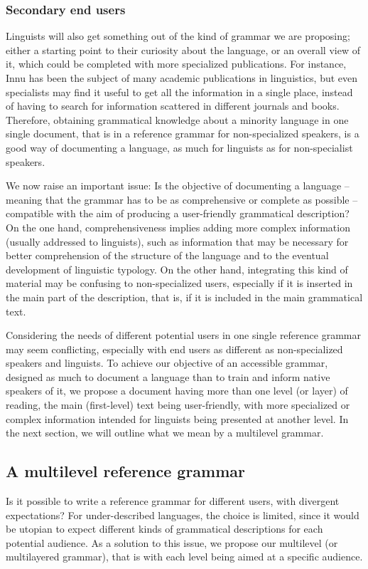 \subsubsection{Secondary end users}
Linguists will also get something out of the kind of grammar we are proposing; either a starting point to their curiosity about the language, or an overall view of it, which could be completed with more specialized publications. For instance, Innu has been the subject of many academic publications in linguistics, but even specialists may find it useful to get all the information in a single place, instead of having to search for information scattered in different journals and books. Therefore, obtaining grammatical knowledge about a minority language in one single document, that is in a reference grammar for non-specialized speakers, is a good way of documenting a language, as much for linguists as for non-specialist speakers.

We now raise an important issue: Is the objective of documenting a language -- meaning that the grammar has to be as comprehensive or complete as possible -- compatible with the aim of producing a user-friendly grammatical description? On the one hand, comprehensiveness implies adding more complex information (usually addressed to linguists), such as information that may be necessary for better comprehension of the structure of the language and to the eventual development of linguistic typology. On the other hand, integrating this kind of material may be confusing to non-specialized users, especially if it is inserted in the main part of the description, that is, if it is included in the main grammatical text.

Considering the needs of different potential users in one single reference grammar may seem conflicting, especially with end users as different as non-specialized speakers and linguists. To achieve our objective of an accessible grammar, designed as much to document a language than to train and inform native speakers of it, we propose a document having more than one level (or layer) of reading, the main (first-level) text being user-friendly, with more specialized or complex information intended for linguists being presented at another level. In the next section, we will outline what we mean by a multilevel grammar. 

\subsection{A multilevel reference grammar}
 Is it possible to write a reference grammar for different users, with divergent expectations? For under-described languages, the choice is limited, since it would be utopian to expect different kinds of grammatical descriptions for each potential audience. As a solution to this issue, we propose our multilevel (or multilayered grammar), that is with each level being aimed at a specific audience.

